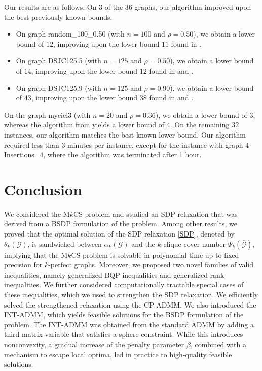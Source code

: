 \documentclass[11pt, a4paper]{article}
\newcommand{\mc}{\mathcal}
\begin{document}
Our results are as follows.
On 3 of the 36 graphs, our algorithm improved upon the best previously known bounds:
\begin{itemize}
    \item On graph random\_100\_0.50 (with $n=100$ and $\rho = 0.50$), we obtain a lower bound of $12$, improving upon the lower bound $11$ found in \cite{Pucher2025PracticalExperience}.
    \item On graph DSJC125.5 (with $n=125$ and $\rho = 0.50$), we obtain a lower bound of $14$, improving upon the lower bound $12$ found in \cite{Dukanovic2007SDPGraphColoring} and \cite{Kuryatnikova2022MkCSProblem}.
    \item On graph DSJC125.9 (with $n=125$ and $\rho = 0.90$), we obtain a lower bound of $43$, improving upon the lower bound $38$ found in \cite{Dukanovic2007SDPGraphColoring} and \cite{Kuryatnikova2022MkCSProblem}.
\end{itemize}
On the graph myciel3 (with $n=20$ and $\rho = 0.36$), we obtain a lower bound of $3$, whereas the algorithm from \cite{Gaar2020SDPGraphColoring} yields a lower bound of $4$.
On the remaining 32 instances, our algorithm matches the best known lower bound.
Our algorithm required less than 3 minutes per instance, except for the instance with graph 4-Insertions\_4,  where the algorithm was terminated after 1 hour.

\section{Conclusion} \label{Sec: Conclusion}
We considered the M$k$CS problem and studied an SDP relaxation that was derived from a BSDP formulation of the problem.  
Among other results, we proved that the optimal solution of the SDP relaxation \eqref{SDP}, denoted by $\theta_k(\mc{G})$, is sandwiched between $\alpha_k(\mc{G})$ and the $k$-clique cover number $\Psi_k(\overline{\mc{G}})$, implying that the M$k$CS problem is solvable in polynomial time up to fixed precision for $k$-perfect graphs. 
Moreover, we proposed two novel families of valid inequalities, namely generalized BQP inequalities and generalized rank inequalities. 
We further considered computationally tractable special cases of these inequalities, which we used to strengthen the SDP relaxation.
We efficiently solved the strengthened relaxation using the CP-ADMM. 
We also introduced the INT-ADMM, which yields feasible solutions for the BSDP formulation of the problem. 
The INT-ADMM was obtained from the standard ADMM by adding a third matrix variable that satisfies a sphere constraint. 
While this introduces nonconvexity, a gradual increase of the penalty parameter $\beta$, combined with a mechanism to escape local optima, led in practice to high-quality feasible solutions.
\end{document}
